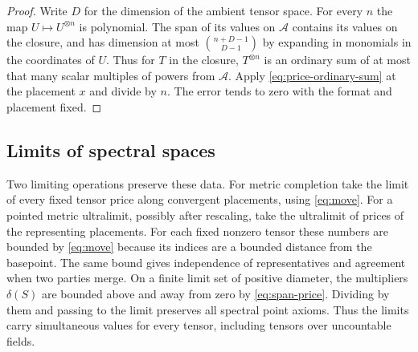 \begin{proof}
Write $D$ for the dimension of the ambient tensor space. For every $n$
the map $U\mapsto U^{\otimes n}$ is polynomial. The span of its values
on $\mathcal A$ contains its values on the closure, and has dimension
at most $\binom{n+D-1}{D-1}$ by expanding in monomials in the coordinates
of $U$. Thus for $T$ in the closure, $T^{\otimes n}$ is an ordinary sum of
at most that many scalar multiples of powers from $\mathcal A$.
Apply \eqref{eq:price-ordinary-sum} at the placement $x$ and divide by $n$.
The error tends to zero with the format and placement fixed.
\end{proof}

\subsection{Limits of spectral spaces}\label{sec:limits}
Two limiting operations preserve these data. For metric completion take
the limit of every fixed tensor price along convergent placements,
using \eqref{eq:move}. For a pointed metric ultralimit, possibly after
rescaling, take the ultralimit of prices of the representing placements.
For each fixed nonzero tensor these numbers are bounded by \eqref{eq:move}
because its indices are a bounded distance from the basepoint.
The same bound gives independence of representatives and agreement when
two parties merge. On a finite limit set of positive diameter, the
multipliers $\delta(S)$ are bounded above and away from zero by
\eqref{eq:span-price}. Dividing by them and passing to the limit preserves
all spectral point axioms. Thus the limits carry simultaneous values
for every tensor, including tensors over uncountable fields.


